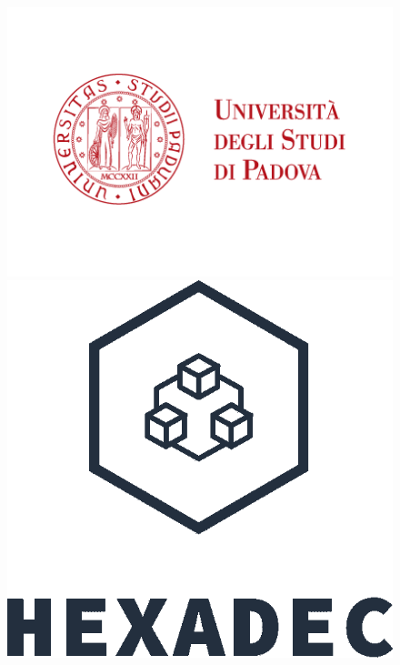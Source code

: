 \thispagestyle{empty}


\begin{figure}[!tbp]
  \centering
  \begin{minipage}[b]{0.5\textwidth}
    \includegraphics[width=\textwidth]{../../template/images/LogoUni2.png}

  \end{minipage}
  \hfill
  \begin{minipage}[b]{0.3\textwidth}
    \includegraphics[width=\textwidth]{../../template/images/logo.png}
   
  \end{minipage}
\end{figure}


